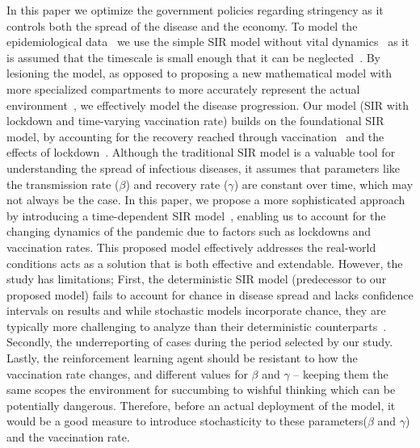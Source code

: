 \documentclass[tikz,fleqn,12pt]{wlscirep}
\begin{document}
In this paper we optimize the government policies regarding stringency as it controls both the spread of the disease and the economy. To model the epidemiological data~\cite{WorldometerCorona} we use the simple SIR model without vital dynamics~\cite{Hethcote1989, Hethcote2008, ALLEN2017128} as it is assumed that the timescale is small enough that it can be neglected~\cite{Cooper2020}. By lesioning the model, as opposed to proposing a new mathematical model with more specialized compartments to more accurately represent the actual environment~\cite{Bjrnstad2020, Mwalili2020}, we effectively model the disease progression. Our model (SIR with lockdown and time-varying vaccination rate) builds on the foundational SIR model, by accounting for the recovery reached through vaccination~\cite{Marinov2022,MaurciodeCarvalho2023,Thater,Turkyilmazoglu2022,YALADANDA2022101052} and the effects of lockdown~\cite{Hale2021,SIRLockdown,NBERw26981,NBERw26867}. Although the traditional SIR model is a valuable tool for understanding the spread of infectious diseases, it assumes that parameters like the transmission rate ($\beta$) and recovery rate ($\gamma$) are constant over time, which may not always be the case. In this paper, we propose a more sophisticated approach by introducing a time-dependent SIR model~\cite{TimeDependentSIR}, enabling us to account for the changing dynamics of the pandemic due to factors such as lockdowns and vaccination rates. This proposed model effectively addresses the real-world conditions acts as a solution that is both effective and extendable. However, the study has limitations; First, the deterministic SIR model (predecessor to our proposed model) fails to account for chance in disease spread and lacks confidence intervals on results and while stochastic models incorporate chance, they are typically more challenging to analyze than their deterministic counterparts~\cite{Hethcote2008}. Secondly, the underreporting of cases during the period selected by our study. Lastly, the reinforcement learning agent should be resistant to how the vaccination rate changes, and different values for $\beta$ and $\gamma$ -- keeping them the same scopes the environment for succumbing to wishful thinking which can be potentially dangerous. Therefore, before an actual deployment of the model, it would be a good measure to introduce stochasticity to these parameters($\beta$ and $\gamma$) and the vaccination rate. 
\end{document}
